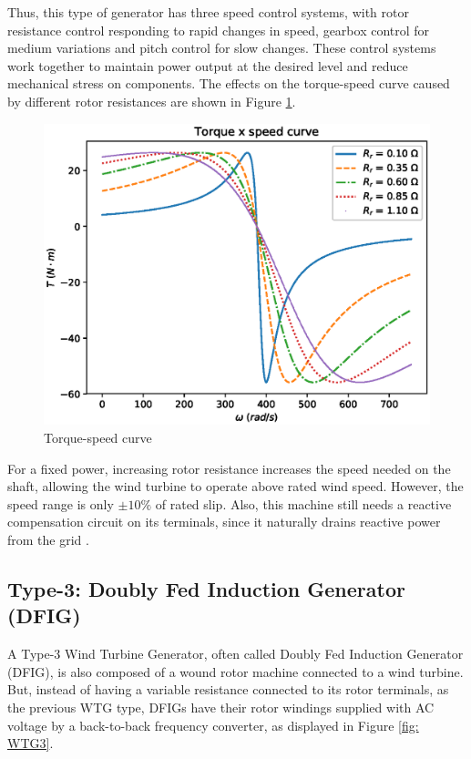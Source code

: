 Thus, this type of generator has three speed control systems, with rotor resistance control responding to rapid changes in speed, gearbox control for medium variations and pitch control for slow changes. These control systems work together to maintain power output at the desired level and reduce mechanical stress on components. The effects on the torque-speed curve caused by different rotor resistances are shown in Figure \ref{fig: Tw}.

\begin{figure}[h]
	\caption{Torque-speed curve}
	\begin{center}
		\includegraphics[scale=.6]{Images/Tw_curve.eps}
	\end{center}
	\label{fig: Tw}
\end{figure}

For a fixed power, increasing rotor resistance increases the speed needed on the shaft, allowing the wind turbine to operate above rated wind speed. However, the speed range is only $\pm 10\%$ of rated slip. Also, this machine still needs a reactive compensation circuit on its terminals, since it naturally drains reactive power from the grid \cite{Muljadi2010}.

\subsection{Type-3: Doubly Fed Induction Generator (DFIG)}

A Type-3 Wind Turbine Generator, often called Doubly Fed Induction Generator (DFIG), is also composed of a wound rotor machine connected to a wind turbine. But, instead of having a variable resistance connected to its rotor terminals, as the previous WTG type, DFIGs have their rotor windings supplied with AC voltage by a back-to-back frequency converter, as displayed in Figure \ref{fig: WTG3}. 

